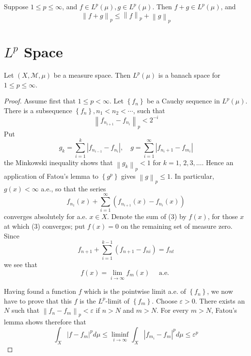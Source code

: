 \documentclass[12pt, a4paper, oneside]{book}
\begin{document}
\begin{theorem} 
    Suppose $1 \leq p \leq \infty$, and $f \in L^{p}(\mu), g \in L^{p}(\mu)$. Then $f+g \in L^{p}(\mu)$, and
    \begin{equation*}
        \left\| f +g\right\|_{p} \leq\left\| f \right\|_{p}+\left\| g \right\|_{p}
    \end{equation*}
\end{theorem}


\section{\texorpdfstring{$L^p$}{} Space}
\begin{theorem}
    Let $\left(X,\mathcal{M},\mu\right)$ be a measure space. Then $L^{p}(\mu)$ is a banach space for $1 \leq p \leq \infty$.
    \begin{proof}
        Assume first that $1 \leq p<\infty$. Let $\left\{f_{n}\right\}$ be a Cauchy sequence in $L^p(\mu)$. There is a subsequence $\left\{f_{n}\right\}, n_{1}<n_{2}<\cdots$, such that
        \begin{equation*}
            \left\|f_{n_{i+1}}-f_{n_i}\right\|_{p}<2^{-i}
        \end{equation*}
        Put
        \begin{equation*}
            g_{k}=\sum_{i=1}^{k}\left|f_{n_{i-1}}-f_{n_{i}}\right|, \quad g=\sum_{i=1}^{\infty}\left|f_{n_{i}+1}-f_{m_{i}}\right|
        \end{equation*}
        the Minkowski inequality shows that
        $\left\|g_{k}\right\|_{p}<1$
        for $k=1$, $2,3, \ldots$. Hence an application of Fatou's lemma to
        $\left\{g^p\right\}$ gives $\left\| g \right\|_{p} \leq 1$.
        In particular, $g(x)<\infty$ a.e., so that the series
        \begin{equation*}
            f_{n_{1}}(x)+\sum_{i=1}^{\infty}\left(f_{n_{i+1}}(x)-f_{n_i}(x)\right)
        \end{equation*}
        converges absolutely for a.e. $x \in X$. Denote the sum of (3) by $f(x)$, for those $x$ at which (3) converges; put $f(x)=0$ on the remaining set of measure zero. Since
        $$f_{n+1}+\sum_{i=1}^{k-1}\left(f_{n+1}-f_{n i}\right)=f_{n t} $$
        we see that
        $$f(x)=\lim _{i \rightarrow \infty} f_{m}(x) \quad \text { a.e. } $$

        Having found a function $f$ which is the pointwise limit a.e. of $\left\{f_{n}\right\}$, we now have to prove that this $f$ is the $L^{p}$-limit of $\left\{f_{m}\right\}$. Choose $\varepsilon>0$. There exists an $N$ such that $\left\|f_{n}-f_{m}\right\|_{p}<\varepsilon$ if $n>N$ and $m>N$. For every $m>N$, Fatou's lemma shows therefore that
        $$
            \int_{X}\left|f-f_{m}\right|^{p} d \mu \leq \liminf _{i \rightarrow \infty} \int_{X}\left|f_{m_{i}}-f_{m}\right|^{p} d \mu \leq \varepsilon^{p}
        $$


\end{proof}
\end{theorem}
\end{document}
